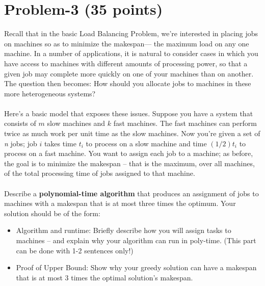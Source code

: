 \documentclass[11pt]{article}
\begin{document}
\section*{Problem-3 (35 points)}
Recall that in the basic Load Balancing Problem, we’re interested in placing jobs on machines so as to minimize the makespan— the maximum load on any one machine. In a number of applications, it is natural to consider cases in which you have access to machines with different amounts of processing power, so that a given job may complete more quickly on one of your machines than on another. The question then becomes: How should you allocate jobs to machines in these more heterogeneous systems?
\\ \\
Here’s a basic model that exposes these issues. Suppose you have a system that consists of $m$ slow machines and $k$ fast machines. The fast machines can perform twice as much work per unit time as the slow machines. Now you’re given a set of \textit{n} jobs; job $i$ takes time $\mathit{t_i}$ to process on a slow machine and time $\mathit{(1/2)t_i}$ to process on a fast machine. You want to assign each job to a machine; as before, the goal is to minimize the makespan -- that is the maximum, over all machines, of the total processing time of jobs assigned to that machine.
\\ \\
Describe a \textbf{polynomial-time algorithm} that produces an assignment of jobs to machines with a makespan that is at most three times the optimum. Your solution should be of the form:
\begin{itemize}
    \item Algorithm and runtime: Briefly describe how you will assign tasks to machines -- and explain why your algorithm can run in poly-time. (This part can be done with 1-2 sentences only!)
    \item Proof of Upper Bound: Show why your greedy solution can have a makespan that is at most 3 times the optimal solution's makespan.
\end{itemize}

\newpage
\end{document}

